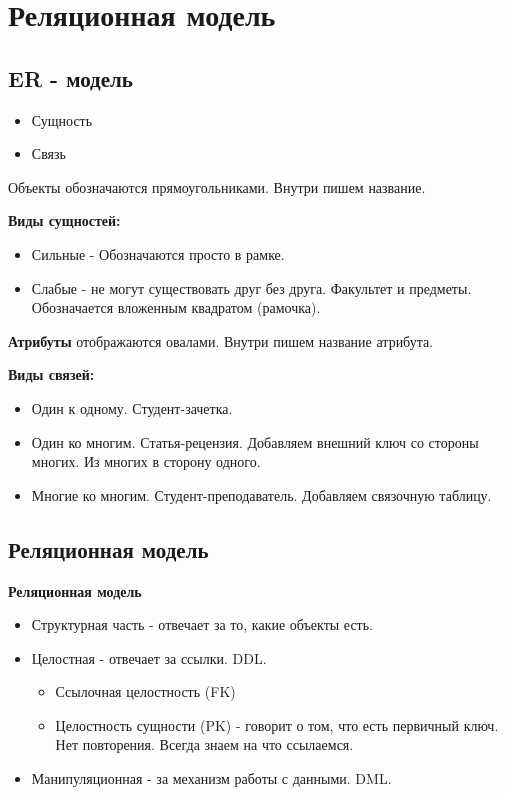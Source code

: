 \chapter{Реляционная модель}

\section{ER - модель}

\begin{itemize}
	\item Сущность
	\item Связь
\end{itemize}

Объекты обозначаются прямоугольниками. Внутри пишем название.

\textbf{Виды сущностей:}
\begin{itemize}
	\item Сильные - Обозначаются просто в рамке.
	\item Слабые - не могут существовать друг без друга. Факультет и предметы.
	      Обозначается вложенным квадратом (рамочка).
\end{itemize}

\textbf{Атрибуты} отображаются овалами. Внутри пишем название атрибута.

\textbf{Виды связей:}
\begin{itemize}
	\item Один к одному. Студент-зачетка.
	\item Один ко многим. Статья-рецензия. Добавляем внешний ключ со стороны многих.
	      Из многих в сторону одного.
	\item Многие ко многим. Студент-преподаватель. Добавляем связочную таблицу.
\end{itemize}

\section{Реляционная модель}

\textbf{Реляционная модель}
\begin{itemize}
	\item Структурная часть - отвечает за то, какие объекты есть.
	\item Целостная - отвечает за ссылки. DDL.
	      \begin{itemize}
		      \item Ссылочная целостность (FK)
		      \item Целостность сущности (PK) - говорит о том, что есть первичный ключ.
		            Нет повторения. Всегда знаем на что ссылаемся.
	      \end{itemize}
	\item Манипуляционная - за механизм работы с данными. DML.
\end{itemize}

